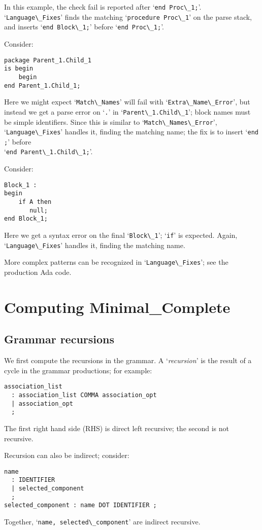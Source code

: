\documentclass{article}
\newcommand{\code}[1]{`\lstinline|#1|'}
\begin{document}
In this example, the check fail is reported after \code{end Proc\_1;}.\\
\code{Language\_Fixes} finds the matching \code{procedure Proc\_1} on
the parse stack, and inserts \code{end Block\_1;} before
\code{end Proc\_1;}.

Consider:
\begin{lstlisting}
package Parent_1.Child_1
is begin
    begin
end Parent_1.Child_1;
\end{lstlisting}
Here we might expect \code{Match\_Names} will fail with
\code{Extra\_Name\_Error}, but instead we get a parse error on \code{.}
in \code{Parent\_1.Child\_1}; block names must be simple identifiers.
Since this is similar to \code{Match\_Names\_Error},
\code{Language\_Fixes} handles it, finding the matching name; the
fix is to insert \code{end ;} before\\ \code{end Parent\_1.Child\_1;}.

Consider:
\begin{lstlisting}
Block_1 :
begin
    if A then
       null;
end Block_1;
\end{lstlisting}
Here we get a syntax error on the final \code{Block\_1}; \code{if} is
expected. Again, \code{Language\_Fixes} handles it, finding the
matching name.

More complex patterns can be recognized in \code{Language\_Fixes}; see
the production Ada code.

\section{Computing Minimal\_Complete}
\label{minimal-complete-compute}

\subsection{Grammar recursions}
We first compute the recursions in the grammar. A `{\it recursion}' is
the result of a cycle in the grammar productions; for example:
\begin{verbatim}
association_list
  : association_list COMMA association_opt
  | association_opt
  ;
\end{verbatim}
The first right hand side (RHS) is direct left recursive; the second
is not recursive.

Recursion can also be indirect; consider:
\begin{verbatim}
name
  : IDENTIFIER
  | selected_component
  ;
selected_component : name DOT IDENTIFIER ;
\end{verbatim}
Together, \code{name, selected\_component} are indirect recursive.
\end{document}
